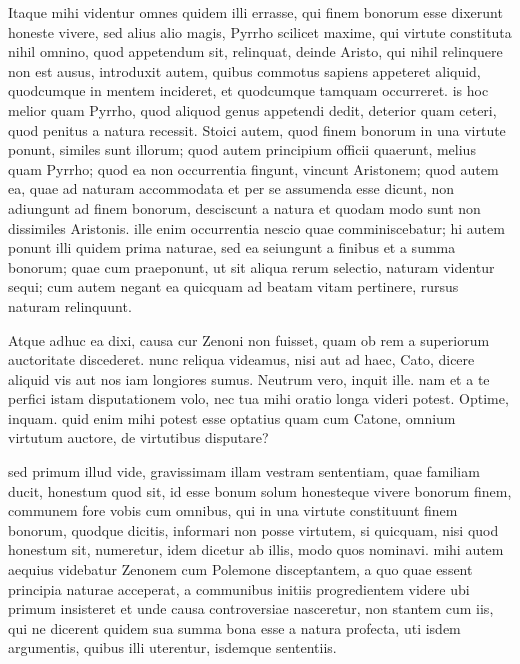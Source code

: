  Itaque mihi videntur omnes quidem illi errasse, qui finem bonorum esse dixerunt honeste vivere, sed alius alio magis, Pyrrho scilicet maxime, qui virtute constituta nihil omnino, quod appetendum sit, relinquat, deinde Aristo, qui nihil relinquere non est ausus, introduxit autem, quibus commotus sapiens appeteret aliquid, quodcumque in mentem incideret, et quodcumque tamquam occurreret. is hoc melior quam Pyrrho, quod aliquod genus appetendi dedit, deterior quam ceteri, quod penitus a natura recessit. Stoici autem, quod finem bonorum in una virtute ponunt, similes sunt illorum; quod autem principium officii quaerunt, melius quam Pyrrho; quod ea non occurrentia fingunt, vincunt Aristonem; quod autem ea, quae ad naturam accommodata et per se assumenda esse dicunt, non adiungunt ad finem bonorum, desciscunt a natura et quodam modo sunt non dissimiles Aristonis. ille enim occurrentia nescio quae comminiscebatur; hi autem ponunt illi quidem prima naturae, sed ea seiungunt a finibus et a summa bonorum; quae cum praeponunt, ut sit aliqua rerum selectio, naturam videntur sequi; cum autem negant ea quicquam ad beatam vitam pertinere, rursus naturam relinquunt.

 Atque adhuc ea dixi, causa cur Zenoni non fuisset, quam ob rem a superiorum auctoritate discederet. nunc reliqua videamus, nisi aut ad haec, Cato, dicere aliquid vis aut nos iam longiores sumus. Neutrum vero, inquit ille. nam et a te perfici istam disputationem volo, nec tua mihi oratio longa videri potest. Optime, inquam. quid enim mihi potest esse optatius quam cum Catone, omnium virtutum auctore, de virtutibus disputare?

 sed primum illud vide, gravissimam illam vestram sententiam, quae familiam ducit, honestum quod sit, id esse bonum solum honesteque vivere bonorum finem, communem fore vobis cum omnibus, qui in una virtute constituunt finem bonorum, quodque dicitis, informari non posse virtutem, si quicquam, nisi quod honestum sit, numeretur, idem dicetur ab illis, modo quos nominavi. mihi autem aequius videbatur Zenonem cum Polemone disceptantem, a quo quae essent principia naturae acceperat, a communibus initiis progredientem videre ubi primum insisteret et unde causa controversiae nasceretur, non stantem cum iis, qui ne dicerent quidem sua summa bona esse a natura profecta, uti isdem argumentis, quibus illi uterentur, isdemque sententiis.


